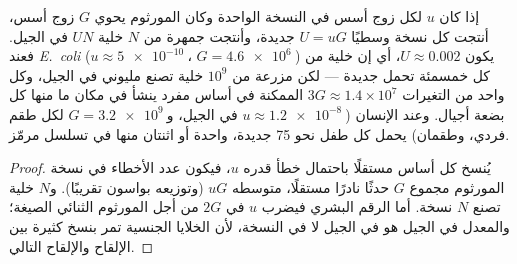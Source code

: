 \begin{theorem}\label{thm:b2:genome-diversification:rate}
إذا كان  $u$ لكل زوج أسس في النسخة الواحدة وكان المورثوم
يحوي $G$ زوج أسس، أنتجت كل نسخة وسطيًا $U = uG$  جديدة، وأنتجت
جمهرة من $N$ خلية $UN$  في الجيل. فعند \emph{E.~coli}
($u \approx \qty{5e-10}{}$، $G =
\qty{4.6e6}{}$) يكون $U \approx 0.002$، أي إن خلية من كل خمسمئة تحمل
 جديدة --- لكن مزرعة من $10^{9}$ خلية تصنع مليوني  في
الجيل، وكل واحد من التغيرات $3G \approx 1.4\times
10^{7}$ الممكنة في أساس مفرد ينشأ في مكان ما منها كل بضعة أجيال.
وعند الإنسان ($u \approx \qty{1.2e-8}{}$ في الجيل،
و$G = \qty{3.2e9}{}$ لكل طقم فردي، وطقمان) يحمل كل طفل نحو \num{75}
 جديدة، واحدة أو اثنتان منها في تسلسل مرمّز.
\end{theorem}
\begin{proof}
يُنسخ كل أساس مستقلًا باحتمال خطأ قدره $u$، فيكون عدد الأخطاء في
نسخة المورثوم مجموع $G$ حدثًا نادرًا مستقلًا، متوسطه $uG$ (وتوزيعه
بواسون تقريبًا). و$N$ خلية تصنع $N$ نسخة. أما الرقم البشري فيضرب $u$
في $2G$ من أجل المورثوم الثنائي الصيغة؛ والمعدل في الجيل هو في
الجيل لا في النسخة، لأن الخلايا الجنسية تمر بنسخ كثيرة بين الإلقاح
والإلقاح التالي.
\end{proof}

